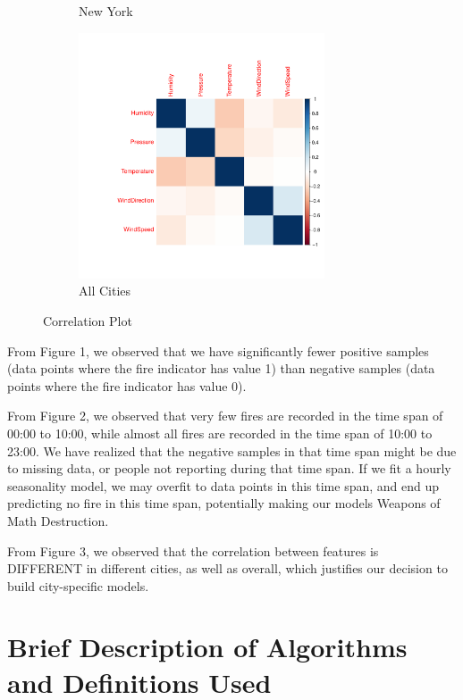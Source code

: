 \documentclass[10pt]{article}
\begin{document}
\begin{figure}[H]
\begin{subfigure}[t]{0.3\textwidth}
        \caption{New York}
    \end{subfigure}
    \begin{subfigure}[t]{0.3\textwidth}
        \centering
        \includegraphics[width=0.8\textwidth]{../plot/corr_all.pdf}
        \caption{All Cities}
    \end{subfigure}
    \caption{Correlation Plot}
\end{figure}

From Figure 1, we observed that we have
significantly fewer positive samples (data points where the fire indicator
has value 1) than negative samples (data points where the fire indicator
has value 0).\par

From Figure 2, we observed that very few fires are recorded in the time
span of 00:00 to 10:00, while almost all fires are recorded in the time
span of 10:00 to 23:00. We have realized that the negative samples in that
time span might be due to missing data, or people not reporting during
that time span. If we fit a hourly seasonality model, we may overfit
to data points in this time span, and end up
predicting no fire in this time span, potentially making our models
Weapons of Math Destruction.\par

From Figure 3, we observed that the correlation between features is
DIFFERENT in different cities, as well as overall, which justifies
our decision to build city-specific models.\par
\section{Brief Description of Algorithms and Definitions Used}
\end{document}

